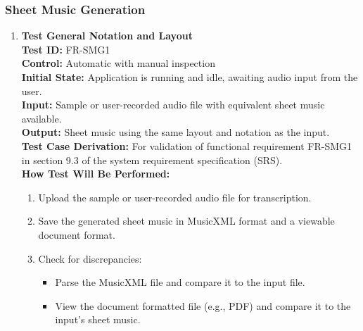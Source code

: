 \documentclass[12pt, titlepage]{article}
\begin{document}
  \subsubsection{Sheet Music Generation}
  \begin{enumerate}
  \item \textbf{Test General Notation and Layout} \\
    \newline
    \textbf{Test ID:} FR-SMG1 \\
    \textbf{Control:} Automatic with manual inspection \\
    \textbf{Initial State:} Application is running and idle, awaiting audio input from the user. \\
    \textbf{Input:} Sample or user-recorded audio file with equivalent sheet music available. \\
    \textbf{Output:} Sheet music using the same layout and notation as the input. \\
    \textbf{Test Case Derivation:} For validation of functional requirement FR-SMG1 in section 9.3 of the system requirement specification (SRS). \\
    \textbf{How Test Will Be Performed:}
    \begin{enumerate}
        \item Upload the sample or user-recorded audio file for transcription.
        \item Save the generated sheet music in MusicXML format and a viewable document format.
        \item Check for discrepancies:
        \begin{itemize}
            \item Parse the MusicXML file and compare it to the input file.
            \item View the document formatted file (e.g., PDF) and compare it to the input’s sheet music.
        \end{itemize}
    \end{enumerate}
  

\end{enumerate}
\end{document}

